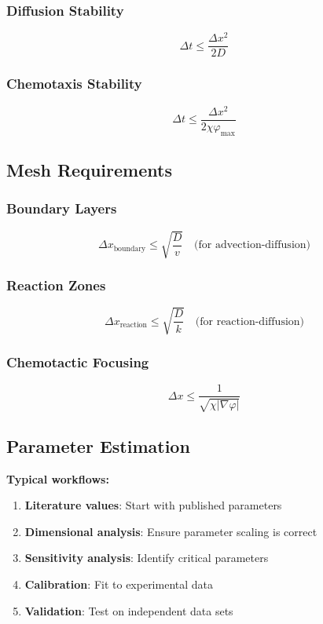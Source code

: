 \documentclass[11pt,a4paper]{article}
\begin{document}
\subsubsection{Diffusion Stability}
\begin{equation}
\Delta t \leq \frac{\Delta x^2}{2D}
\end{equation}

\subsubsection{Chemotaxis Stability}
\begin{equation}
\Delta t \leq \frac{\Delta x^2}{2\chi\varphi_{\max}}
\end{equation}

\subsection{Mesh Requirements}

\subsubsection{Boundary Layers}
\begin{equation}
\Delta x_{\text{boundary}} \leq \sqrt{\frac{D}{v}} \quad \text{(for advection-diffusion)}
\end{equation}

\subsubsection{Reaction Zones}
\begin{equation}
\Delta x_{\text{reaction}} \leq \sqrt{\frac{D}{k}} \quad \text{(for reaction-diffusion)}
\end{equation}

\subsubsection{Chemotactic Focusing}
\begin{equation}
\Delta x \leq \frac{1}{\sqrt{\chi|\nabla\varphi|}}
\end{equation}

\subsection{Parameter Estimation}

\textbf{Typical workflows:}
\begin{enumerate}
    \item \textbf{Literature values}: Start with published parameters
    \item \textbf{Dimensional analysis}: Ensure parameter scaling is correct
    \item \textbf{Sensitivity analysis}: Identify critical parameters
    \item \textbf{Calibration}: Fit to experimental data
    \item \textbf{Validation}: Test on independent data sets
\end{enumerate}
\end{document}
